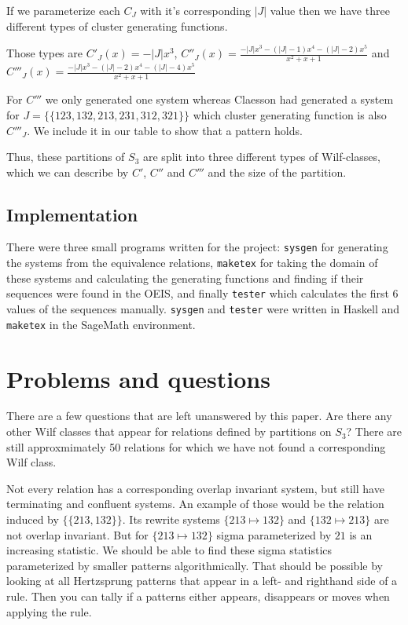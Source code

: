 \documentclass[a4paper, 11pt, english]{article}
\newcommand{\patternrule}{ \mapsto \!}
\theoremstyle{definition}
\newcommand{\Sym}{S}
\begin{document}
If we parameterize each $C_J$ with it's corresponding $|J|$ value then we have
three different types of cluster generating functions.

Those types are $C'_J(x) = -|J|x^3$, $C''_J(x) = \frac{-|J|x^3-(|J|-1)x^4-(|J|-2)x^5}{x^2+x+1}$
and $C'''_J(x) = \frac{-|J|x^3-(|J|-2)x^4-(|J|-4)x^5}{x^2+x+1}$

For $C'''$ we only generated one system whereas Claesson had generated a system for
$J = \{\{ 123, 132, 213, 231, 312, 321 \}\}$ which cluster generating function
is also $C'''_J$. We include it in our table to show that a pattern holds.

Thus, these partitions of $\Sym_3$ are split into three different types
of Wilf-classes, which we can describe by $C'$, $C''$ and $C'''$ and the size
of the partition.

\subsection{Implementation}
There were three small programs written for the project: \verb|sysgen| for generating the
systems from the equivalence relations, \verb|maketex| for taking the domain of these
systems and calculating the generating functions and finding if their sequences
were found in the OEIS, and finally \verb|tester| which calculates the first 6 values
of the sequences manually. \verb|sysgen| and \verb|tester| were written in Haskell and
\verb|maketex| in the SageMath environment. 

\section{Problems and questions}

There are a few questions that are left unanswered by this paper.
Are there any other Wilf classes that appear for relations defined by partitions on $\Sym_3$? There are
still approxmimately 50 relations for which we have not found a corresponding Wilf class. 

Not every relation has a corresponding overlap invariant system, but still have terminating and
confluent systems. An example of those would be the relation induced by $\{ \{ 213, 132
\} \}$. Its rewrite systems ${\{ 213 \patternrule 132 \}}$ and ${\{
132 \patternrule 213 \}}$ are not overlap invariant. 
But for $\{ 213 \patternrule 132 \}$ sigma parameterized by $21$ is an increasing statistic. We
should be able to find these sigma statistics parameterized by smaller patterns algorithmically.
That should be possible by looking at all Hertzsprung patterns that appear in a left- and righthand
side of a rule. Then you can tally if a patterns either appears, disappears or moves when applying the rule.
\end{document}
